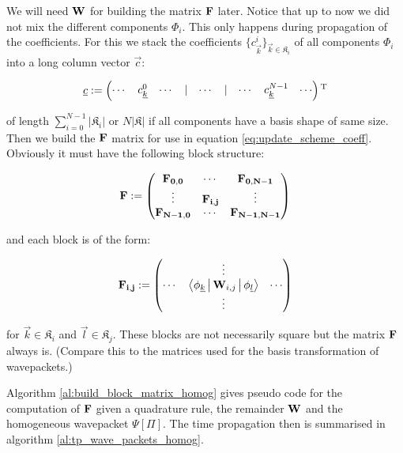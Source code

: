 We will need $\mathbf{W}$ for building the matrix $\mathbf{F}$ later. Notice that up
to now we did not mix the different components $\Phi_i$. This only happens
during propagation of the coefficients. For this we stack the coefficients
$\{c_{\vec{k}}^i\}_{\vec{k} \in \mathfrak{K}_i}$ of all components $\Phi_i$
into a long column vector $\vec{c}$:

\begin{equation*}
  \underline{c} :=
  \begin{pmatrix}
    \cdots & c_{\underline{k}}^0 & \cdots & | & \cdots & | & \cdots & c_{\underline{k}}^{N-1} & \cdots
  \end{pmatrix}
  {}^{\textnormal{T}}
\end{equation*}

of length $\sum_{i=0}^{N-1} |\mathfrak{K}_i|$ or $N |\mathfrak{K}|$ if all
components have a basis shape of same size. Then we build the $\mathbf{F}$ matrix
for use in equation \eqref{eq:update_scheme_coeff}. Obviously it must have the
following block structure:

\begin{equation*}
  \mathbf{F} :=
  \begin{pmatrix}
    \mathbf{F_{0,0}}   & \cdots        & \mathbf{F_{0, N-1}} \\
    \vdots          & \mathbf{F_{i,j}} & \vdots \\
    \mathbf{F_{N-1,0}} & \cdots        & \mathbf{F_{N-1, N-1}} \\
  \end{pmatrix}
\end{equation*}

and each block is of the form:

\begin{equation*}
  \mathbf{F_{i,j}} :=
    \begin{pmatrix}
    {}     & \vdots                                               & {} \\
    \cdots & \Braket{ \phi_{\underline{k}} | \mathbf{W}_{i,j} | \phi_{\underline{l}} } & \cdots \\
    {}     & \vdots                                               & {}
  \end{pmatrix}
\end{equation*}

for $\vec{k} \in \mathfrak{K}_i$ and $\vec{l} \in \mathfrak{K}_j$. These blocks
are not necessarily square but the matrix $\mathbf{F}$ always is. (Compare this
to the matrices used for the basis transformation of wavepackets.)

Algorithm \ref{al:build_block_matrix_homog} gives pseudo code for the computation
of $\mathbf{F}$ given a quadrature rule, the remainder $\mathbf{W}$ and the homogeneous
wavepacket $\Psi[\Pi]$. The time propagation then is summarised in algorithm
\ref{al:tp_wave_packets_homog}.


